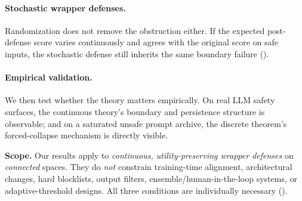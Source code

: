\documentclass[11pt]{article}
\begin{document}
\paragraph{Stochastic wrapper defenses.}
Randomization does not remove the obstruction either. If the expected
post-defense score varies continuously and agrees with the original
score on safe inputs, the stochastic defense still inherits the same
boundary failure ().

\paragraph{Empirical validation.}
We then test whether the theory matters empirically. On real LLM safety
surfaces, the continuous theory's boundary and persistence structure is
observable; and on a saturated unsafe prompt archive, the discrete
theorem's forced-collapse mechanism is directly visible.

\medskip
\noindent\textbf{Scope.}
Our results apply to \emph{continuous, utility-preserving wrapper defenses} on \emph{connected} spaces. They do \emph{not} constrain training-time alignment, architectural changes, hard blocklists, output filters, ensemble/human-in-the-loop systems, or adaptive-threshold designs. All three conditions are individually necessary ().
\end{document}
